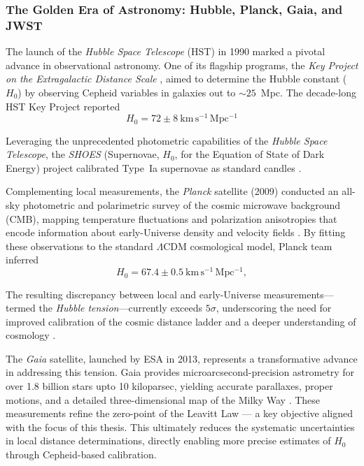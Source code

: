 \subsubsection{The Golden Era of Astronomy: Hubble, Planck, Gaia, and JWST}


The launch of the \emph{Hubble Space Telescope} (HST) in 1990 marked a pivotal advance in observational astronomy. One of its flagship programs, the \emph{Key Project on the Extragalactic Distance Scale} \citep{2001freedman}, aimed to determine the Hubble constant ($H_0$) by observing Cepheid variables in galaxies out to $\sim 25$~Mpc. The decade-long HST Key Project reported
\[
H_0 = 72 \pm 8\ \mathrm{km\,s^{-1}\,Mpc^{-1}}
\]


Leveraging the unprecedented photometric capabilities of the \emph{Hubble Space Telescope}, the \emph{SHOES} (Supernovae, $H_0$, for the Equation of State of Dark Energy) project calibrated Type~Ia supernovae as standard candles \citep{1998riess}.  



Complementing local measurements, the \emph{Planck} satellite (2009) conducted an all-sky photometric and polarimetric survey of the cosmic microwave background (CMB), mapping temperature fluctuations and polarization anisotropies that encode information about early-Universe density and velocity fields \citep{2018planck,2018planckVI}. By fitting these observations to the standard $\Lambda$CDM cosmological model, Planck team inferred
\[
H_0 = 67.4 \pm 0.5\ \mathrm{km\,s^{-1}\,Mpc^{-1}},
\]



The resulting discrepancy between local and early-Universe measurements—termed the \emph{Hubble tension}—currently exceeds $5\sigma$, underscoring the need for improved calibration of the cosmic distance ladder and a deeper understanding of cosmology \citep{2022riess_tension}.

The \emph{Gaia} satellite, launched by ESA in 2013, represents a transformative advance in addressing this tension. Gaia provides microarcsecond-precision astrometry for over 1.8 billion stars upto 10 kiloparsec, yielding accurate parallaxes, proper motions, and a detailed three-dimensional map of the Milky Way \citep{2021bailer}. These measurements refine the zero-point of the Leavitt Law — a key objective aligned with the focus of this thesis. This ultimately reduces the systematic uncertainties in local distance determinations, directly enabling more precise estimates of $H_0$ through Cepheid-based calibration.

